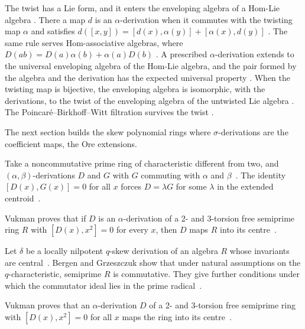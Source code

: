 The twist has a Lie form, and it enters the enveloping algebra of a Hom-Lie
algebra \cite[p.~4]{JiangKangLu2026}. There a map $d$ is an
$\alpha$-derivation when it commutes with the twisting map $\alpha$ and
satisfies $d([x,y])=[d(x),\alpha(y)]+[\alpha(x),d(y)]$ \cite[Definition~2.3,
p.~4]{JiangKangLu2026}. The same rule serves Hom-associative algebras, where
$D(ab)=D(a)\alpha(b)+\alpha(a)D(b)$ \cite[Definition~2.9,
p.~5]{JiangKangLu2026}. A prescribed $\alpha$-derivation extends to the
universal enveloping algebra of the Hom-Lie algebra, and the pair formed by
the algebra and the derivation has the expected universal property
\cite[Theorem~3.11, p.~13]{JiangKangLu2026}. When the twisting map is
bijective, the enveloping algebra is isomorphic, with the derivations, to the
twist of the enveloping algebra of the untwisted Lie algebra
\cite[Theorem~4.8, p.~18]{JiangKangLu2026}. The Poincar\'e--Birkhoff--Witt
filtration survives the twist \cite[Theorem~4.10, p.~19]{JiangKangLu2026}.

The next section builds
the skew polynomial rings where $\sigma$-derivations are the coefficient
maps, the Ore extensions.

Take a noncommutative prime ring of characteristic different from two, and
$(\alpha,\beta)$-derivations $D$ and $G$ with $G$ commuting with $\alpha$ and
$\beta$~\cite{WlIdentitiesWithProductsOfAlphaB2006}. The identity $[D(x),G(x)]=0$ for all $x$ forces $D=\lambda
G$ for some $\lambda$ in the extended
centroid~\cite{WlIdentitiesWithProductsOfAlphaB2006}.

Vukman proves that if $D$ is an $\alpha$-derivation of a 2- and 3-torsion free
semiprime ring $R$ with $[D(x),x^2]=0$ for every $x$, then $D$ maps $R$ into
its centre~\cite{WlOnADerivationsOfPrimeAndSemipr2005}.

Let $\delta$ be a locally nilpotent $q$-skew
derivation of an algebra $R$ whose invariants are central~\cite{WlLocallyNilpotentSkewDerivation2017}. Bergen and
Grzeszczuk show that under natural
assumptions on the $q$-characteristic, semiprime $R$ is commutative. They give %
further conditions under which the commutator ideal lies in the prime
radical~\cite{WlLocallyNilpotentSkewDerivation2017}.

Vukman proves that an $\alpha$-derivation $D$ of a 2- and 3-torsion free
semiprime ring with $[D(x),x^2]=0$ for all $x$ maps the ring into its
centre~\cite{WlFreeActionsOfSemiprimeRingsWit2005}.
